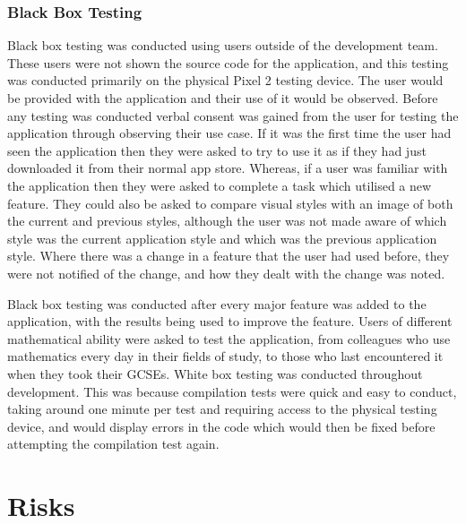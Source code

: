 \documentclass{article}
\begin{document}
\subsubsection{Black Box Testing}

Black box testing was conducted using users outside of the development team. These users were not shown the source code for the application, and this testing was conducted primarily on the physical Pixel 2 testing device. The user would be provided with the application and their use of it would be observed. Before any testing was conducted verbal consent was gained from the user for testing the application through observing their use case. If it was the first time the user had seen the application then they were asked to try to use it as if they had just downloaded it from their normal app store. Whereas, if a user was familiar with the application then they were asked to complete a task which utilised a new feature. They could also be asked to compare visual styles with an image of both the current and previous styles, although the user was not made aware of which style was the current application style and which was the previous application style. Where there was a change in a feature that the user had used before, they were not notified of the change, and how they dealt with the change was noted. \par

Black box testing was conducted after every major feature was added to the application, with the results being used to improve the feature. Users of different mathematical ability were asked to test the application, from colleagues who use mathematics every day in their fields of study, to those who last encountered it when they took their GCSEs. White box testing was conducted throughout development. This was because compilation tests were quick and easy to conduct, taking around one minute per test and requiring access to the physical testing device, and would display errors in the code which would then be fixed before attempting the compilation test again. \par

\section{Risks}
\label{section:risks}
\end{document}
